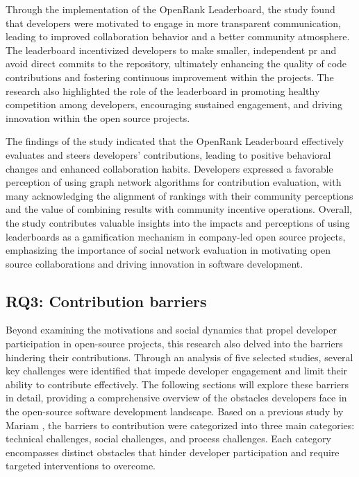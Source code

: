 Through the implementation of the OpenRank Leaderboard, the study found that developers were motivated to engage in more transparent communication, leading to improved collaboration behavior and a better community atmosphere. The leaderboard incentivized developers to make smaller, independent \ac{pr} and avoid direct commits to the repository, ultimately enhancing the quality of code contributions and fostering continuous improvement within the projects. The research also highlighted the role of the leaderboard in promoting healthy competition among developers, encouraging sustained engagement, and driving innovation within the open source projects.

The findings of the study indicated that the OpenRank Leaderboard effectively evaluates and steers developers' contributions, leading to positive behavioral changes and enhanced collaboration habits. Developers expressed a favorable perception of using graph network algorithms for contribution evaluation, with many acknowledging the alignment of rankings with their community perceptions and the value of combining results with community incentive operations. Overall, the study contributes valuable insights into the impacts and perceptions of using leaderboards as a gamification mechanism in company-led open source projects, emphasizing the importance of social network evaluation in motivating open source collaborations and driving innovation in software development.


\subsection{RQ3: Contribution barriers}

Beyond examining the motivations and social dynamics that propel developer participation in open-source projects, this research also delved into the barriers hindering their contributions. Through an analysis of five selected studies, several key challenges were identified that impede developer engagement and limit their ability to contribute effectively. The following sections will explore these barriers in detail, providing a comprehensive overview of the obstacles developers face in the open-source software development landscape. Based on a previous study by Mariam \cite{04guizani2021long}, the barriers to contribution were categorized into three main categories: technical challenges, social challenges, and process challenges. Each category encompasses distinct obstacles that hinder developer participation and require targeted interventions to overcome.


